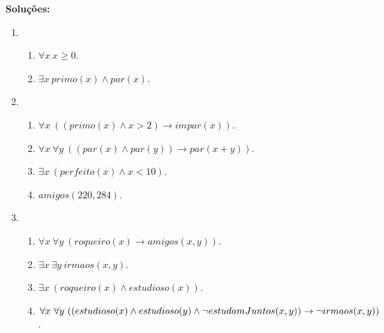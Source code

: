         \textbf{Soluções:}
    
        \begin{enumerate}
            \item        
            \begin{enumerate}
                \item $\forall x \ x \ge 0$.
                \item $\exists x \ primo(x) \land par(x)$.
            \end{enumerate}
            \item
            \begin{enumerate}
                \item $\forall x \ ((primo(x) \land x > 2) \rightarrow impar(x))$.
                \item $\forall x \ \forall y \ ((par(x) \land par(y)) \rightarrow par(x + y))$.
                \item $\exists x \ (perfeito(x) \land x < 10)$.
                \item $amigos(220, 284)$.
            \end{enumerate}
            \item
            \begin{enumerate}
                \item $\forall x \ \forall y \ (roqueiro(x) \rightarrow amigos(x, y))$.
                \item $\exists x \ \exists y \ irmaos(x, y)$.
                \item $\exists x \ (roqueiro(x) \land estudioso(x))$.
                \item $\forall x \ \forall y \ ((estudioso(x) \land estudioso(y) \land \lnot estudamJuntos(x, y)) \rightarrow \\ \lnot irmaos(x, y))$.
            \end{enumerate}
        \end{enumerate}
